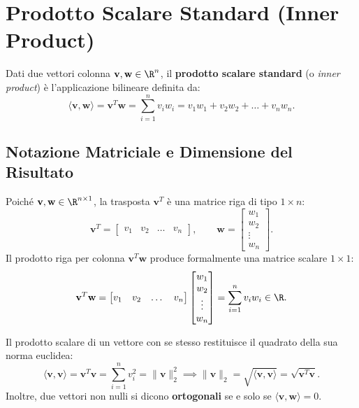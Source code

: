 \FloatBarrier
\section{Prodotto Scalare Standard (Inner Product)}

\begin{definition}
Dati due vettori colonna $\mathbf{v}, \mathbf{w} \in \R^n$, il \textbf{prodotto scalare standard} (o \textit{inner product}) è l'applicazione bilineare definita da:
\begin{equation}
    \langle \mathbf{v}, \mathbf{w} \rangle = \mathbf{v}^T \mathbf{w} = \sum_{i=1}^n v_i w_i = v_1 w_1 + v_2 w_2 + \dots + v_n w_n.
\end{equation}
\end{definition}

\subsection{Notazione Matriciale e Dimensione del Risultato}

Poiché $\mathbf{v}, \mathbf{w} \in \R^{n \times 1}$, la trasposta $\mathbf{v}^T$ è una matrice riga di tipo $1 \times n$:
\begin{equation}
    \mathbf{v}^T = \begin{bmatrix} v_1 & v_2 & \dots & v_n \end{bmatrix}, \qquad \mathbf{w} = \begin{bmatrix} w_1 \\ w_2 \\ \vdots \\ w_n \end{bmatrix}.
\end{equation}
Il prodotto riga per colonna $\mathbf{v}^T \mathbf{w}$ produce formalmente una matrice scalare $1 \times 1$:
\begin{equation}
    \mathbf{v}^T \mathbf{w} = \begin{bmatrix} v_1 & v_2 & \dots & v_n \end{bmatrix} \begin{bmatrix} w_1 \\ w_2 \\ \vdots \\ w_n \end{bmatrix} = \sum_{i=1}^n v_i w_i \in \R.
\end{equation}

\begin{property}
Il prodotto scalare di un vettore con se stesso restituisce il quadrato della sua norma euclidea:
\begin{equation}
    \langle \mathbf{v}, \mathbf{v} \rangle = \mathbf{v}^T \mathbf{v} = \sum_{i=1}^n v_i^2 = \|\mathbf{v}\|_2^2 \implies \|\mathbf{v}\|_2 = \sqrt{\langle \mathbf{v}, \mathbf{v} \rangle} = \sqrt{\mathbf{v}^T \mathbf{v}}.
\end{equation}
Inoltre, due vettori non nulli si dicono \textbf{ortogonali} se e solo se $\langle \mathbf{v}, \mathbf{w} \rangle = 0$.
\end{property}

